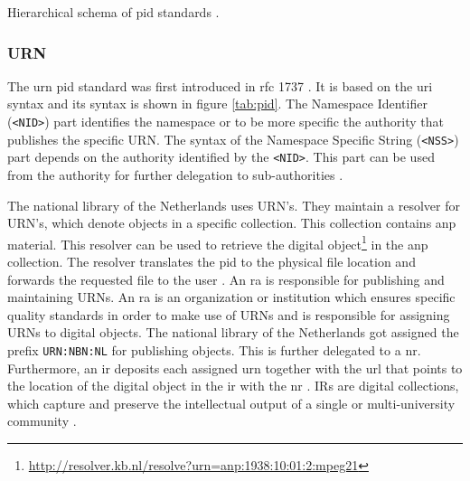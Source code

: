 \begin {table}[H]
\caption {Hierarchical schema of \gls{pid} standards \cite{icn-bd}.} \label{tab:pid} 
\begin{center}
\end{center}
\end {table}


\subsubsection{URN}\label{urn-1}
The \gls{urn} \gls{pid} standard was first introduced in \gls{rfc} 1737 \cite{rfc1737}. It is based on the \gls{uri} syntax and its syntax is shown in figure \ref{tab:pid}. The Namespace Identifier (\texttt{\textless NID\textgreater}) part identifies the namespace or to be more specific the authority that publishes the specific URN.
The syntax of the Namespace Specific String (\texttt{\textless NSS\textgreater}) part depends on the authority identified by the \texttt{\textless NID\textgreater}. This part can be used from the authority for further delegation to sub-authorities \cite{icn-bd}.

The national library of the Netherlands uses URN's. They maintain a resolver for URN's, which denote objects in a specific collection. This collection contains \gls{anp} material.
This resolver can be used to retrieve the digital object\footnote{\url{http://resolver.kb.nl/resolve?urn=anp:1938:10:01:2:mpeg21}} in the \gls{anp} collection. The resolver translates the \gls{pid} to the physical file location and forwards the requested file to the user \cite{kb-metadata}. 
An \gls{ra} is responsible for publishing and maintaining URNs. An \gls{ra} is an organization or institution which ensures specific quality standards in order to make use of URNs and is responsible for assigning URNs to digital objects. The national library of the Netherlands got assigned the prefix \texttt{URN:NBN:NL} for publishing objects. This is further delegated to a \gls{nr}. Furthermore, an \gls{ir} deposits each assigned \gls{urn} together with the \gls{url} that points to the location of the digital object in the \gls{ir} with the \gls{nr} \cite{kb-ir}. IRs are digital collections, which capture and preserve the intellectual output of a single or multi-university community \cite{cwi-ir}.

